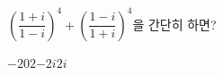 $\left(\dfrac{1+i}{1-i}\right)^4+\left(\dfrac{1-i}{1+i}\right)^4$을 간단히 하면?
\begin{choices32}{$-2$}{$0$}{$2$}{$-2i$}{$2i$}\end{choices32}
